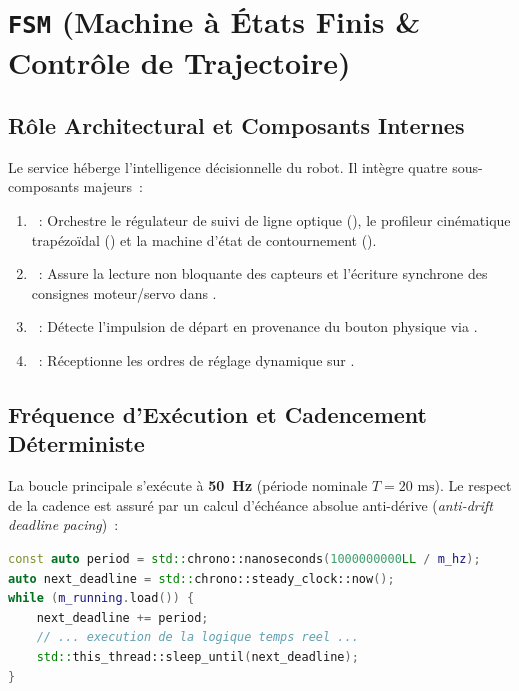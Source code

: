 \section{\texorpdfstring{\texttt{FSM}}{FSM} (Machine à États Finis \& Contrôle de Trajectoire)}

\subsection{Rôle Architectural et Composants Internes}
Le service  héberge l'intelligence décisionnelle du robot. Il intègre quatre sous-composants majeurs~:
\begin{enumerate}
    \item {}~: Orchestre le régulateur de suivi de ligne optique (), le profileur cinématique trapézoïdal () et la machine d'état de contournement ().
    \item {}~: Assure la lecture non bloquante des capteurs et l'écriture synchrone des consignes moteur/servo dans .
    \item {}~: Détecte l'impulsion de départ en provenance du bouton physique via .
    \item {}~: Réceptionne les ordres de réglage dynamique sur .
\end{enumerate}

\subsection{Fréquence d'Exécution et Cadencement Déterministe}
La boucle principale s'exécute à \textbf{50~Hz} (période nominale $T = 20\text{ ms}$). Le respect de la cadence est assuré par un calcul d'échéance absolue anti-dérive (\emph{anti-drift deadline pacing})~:
\begin{lstlisting}[language=C++]
const auto period = std::chrono::nanoseconds(1000000000LL / m_hz);
auto next_deadline = std::chrono::steady_clock::now();
while (m_running.load()) {
    next_deadline += period;
    // ... execution de la logique temps reel ...
    std::this_thread::sleep_until(next_deadline);
}
\end{lstlisting}

